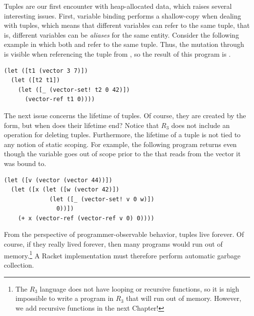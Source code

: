 \documentclass[11pt]{book}
\begin{document}
Tuples are our first encounter with heap-allocated data, which raises
several interesting issues. First, variable binding performs a
shallow-copy when dealing with tuples, which means that different
variables can refer to the same tuple, that is, different variables
can be \emph{aliases} for the same entity. Consider the following
example in which both  and  refer to the same tuple.
Thus, the mutation through  is visible when referencing the
tuple from , so the result of this program is .
\begin{center}
\begin{minipage}{0.96\textwidth}
\begin{lstlisting}
(let ([t1 (vector 3 7)])
  (let ([t2 t1])
    (let ([_ (vector-set! t2 0 42)])
      (vector-ref t1 0))))
\end{lstlisting}
\end{minipage}
\end{center}

The next issue concerns the lifetime of tuples. Of course, they are
created by the  form, but when does their lifetime end?
Notice that $R_3$ does not include an operation for deleting
tuples. Furthermore, the lifetime of a tuple is not tied to any notion
of static scoping. For example, the following program returns
 even though the variable  goes out of scope prior to
the  that reads from the vector it was bound to.
\begin{center}
\begin{minipage}{0.96\textwidth}
\begin{lstlisting}
(let ([v (vector (vector 44))])
  (let ([x (let ([w (vector 42)])
             (let ([_ (vector-set! v 0 w)])
               0))])
    (+ x (vector-ref (vector-ref v 0) 0))))
\end{lstlisting}
\end{minipage}
\end{center}

From the perspective of programmer-observable behavior, tuples live
forever. Of course, if they really lived forever, then many programs
would run out of memory.\footnote{The $R_3$ language does not have
  looping or recursive functions, so it is nigh impossible to write a
  program in $R_3$ that will run out of memory. However, we add
  recursive functions in the next Chapter!} A Racket implementation
must therefore perform automatic garbage collection.
\end{document}
